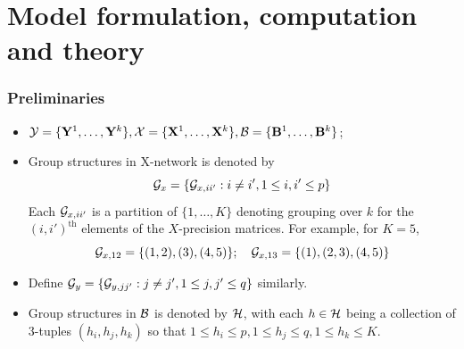 \documentclass[10pt]{beamer}
\theoremstyle{definition}
\DeclareMathOperator*{\Th}{\text{th}}
\begin{document}
\section{Model formulation, computation and theory}

\begin{frame}
\frametitle{Preliminaries}

\begin{itemize}
\item ${\cal{Y}} = \{ {\mathbf{Y}}^1, \ldots, {\mathbf{Y}}^k\},
{\cal{X}} = \{ {\mathbf{X}}^1, \ldots, {\mathbf{X}}^k\}, {\cal{B}} = \{ {\mathbf{B}}^1, \ldots, {\mathbf{B}}^k \}$;

\item Group structures in X-network is denoted by
%
\[
{\cal{G}}_x = \{{\cal{G}}_{x,ii'}: i \neq i', 1 \leq i,i' \leq p \}
\]
%
Each ${\cal{G}}_{x,ii'}$ is a partition of $\{ 1, \ldots, K\}$ denoting grouping over $k$ for the $(i,i')^{\Th}$ elements of the $X$-precision matrices. For example, for $K=5$,
%
\[
{\cal{G}}_{x,12} = \{ (1,2),(3),(4,5)\}; \quad
{\cal{G}}_{x,13} = \{ (1),(2,3),(4,5)\}
\]
%
\item Define ${\cal{G}}_y = \{{\cal{G}}_{y,jj'}: j \neq j', 1 \leq j,j' \leq q \}
$ similarly.
\item Group structures in ${\cal{B}}$ is denoted by ${\cal{H}}$, with each $h \in {\cal{H}}$ being a collection of 3-tuples $(h_i,h_j,h_k)$ so that $1 \leq h_i \leq p, 1 \leq h_j \leq q, 1 \leq h_k \leq K$.
\end{itemize}

\end{frame}
\end{document}
